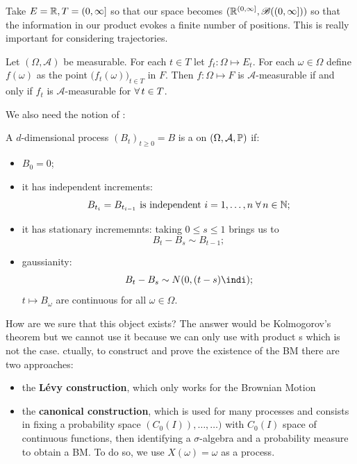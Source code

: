 \documentclass[crop=false, class=article]{standalone}
\begin{document}
Take $E=\mathbb{R},T=(0,\infty]$ so that our space becomes $(\mathbb{R}^{(0,\infty]},\mathscr{B}((0,\infty]))$ so that the information in our product \sa{} evokes a finite number of positions. This is really important for considering trajectories.
\begin{proposition}
	Let $(\Omega,\mathcal{A})$ be measurable. For each $t\in T$ let $f_{t}:\Omega\mapsto E_{t}$. For each $\omega\in\Omega$ define $f(\omega)$ as the point ${\big(f_{t}(\omega)\big)}_{t\in T}$ in $F$. Then $f:\Omega\mapsto F$ is $\mathcal{A}$-measurable if and only if $f_{t}$ is $\mathcal{A}$-measurable for $\forall\, t\in T$.
\end{proposition}
We also need the notion of \emph{\brm}:
\begin{revise}
	A $d$-dimensional process ${(B_{t})}_{t\geq0}=B$ is a \brm{} on $(\Omega,\mathcal{A},\mathbb{P})$ if:
	\begin{itemize}
		\item $B_{0}=0$;
		\item it has independent increments:
		\begin{equation*}
			B_{t_{i}}=B_{t_{i-1}}\text{ is independent }i=1,\ldots,n\;\forall\, n\in\mathbb{N};
		\end{equation*}
		\item it has stationary incrememnts: taking $0\leq s\leq 1$ brings us to 
		\begin{equation*}
			B_{t}-B_{s}\sim B_{t-1};
		\end{equation*}
		\item gaussianity:
		\begin{equation*}
			B_{t}-B_{s}\sim N(0,(t-s)\indi);
		\end{equation*}
		$t\mapsto B_{\omega}$ are continuous for all $\omega\in\Omega$.
	\end{itemize}
\end{revise}
	How are we sure that this object exists? The answer would be Kolmogorov's theorem but we cannot use it because we can only use with product \sa s which is not the case.
	ctually, to construct and prove the existence of the BM there are two approaches:
	\begin{itemize}
		\item the \textbf{Lévy construction}, which only works for the Brownian Motion
		\item the \textbf{canonical construction}, which is used for many processes and consists in fixing a probability space $(C_0(I)), \ldots, \ldots)$ with $C_0(I)$ space of continuous functions, then identifying a $\sigma$-algebra and a probability measure to obtain a BM. To do so, we use $X(\omega) = \omega$ as a process.
	\end{itemize}
\end{document}
